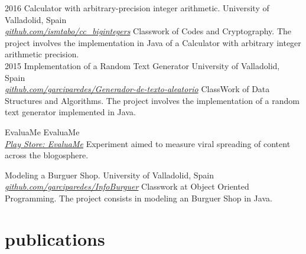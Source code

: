 \documentclass[]{friggeri-cv} %
\begin{document}
\begin{entrylist}
  
  \entry
    {2016}
    {Calculator with arbitrary-precision integer arithmetic. }
    {University of Valladolid, Spain \\ 
    \href{https://github.com/ismtabo/cc_bigintegers}{\textit{github.com/ismtabo/cc\_bigintegers}}}
    {Classwork of Codes and Cryptography. The project involves the implementation in Java of a Calculator with  arbitrary integer arithmetic precision.}
    \\
  
  \entry
    {2015}
    {Implementation of a Random Text Generator}
    {University of Valladolid, Spain \\
    \href{https://github.com/garciparedes/Generador-de-texto-aleatorio}{\textit{github.com/garciparedes/Generador-de-texto-aleatorio}} }
    {ClassWork of Data Structures and Algorithms. The project involves the implementation of a random text generator implemented in Java.}
  
  \entry
    {}
    {EvaluaMe}
    {EvaluaMe \\
    \href{https://play.google.com/store/apps/details?id=com.garciparedes.evaluame}{\textit{Play Store: EvaluaMe}} }
    {Experiment aimed to measure viral spreading of content across the blogosphere.}
    
    \entry
    {}
    {Modeling a Burguer Shop.}
    {University of Valladolid, Spain \\ 
    \href{https://github.com/garciparedes/InfoBurguer}{\textit{github.com/garciparedes/InfoBurguer}}}
    {Classwork at Object Oriented Programming. The project consists in modeling an Burguer Shop  in Java.}

\end{entrylist}


\section{publications}
\end{document}
